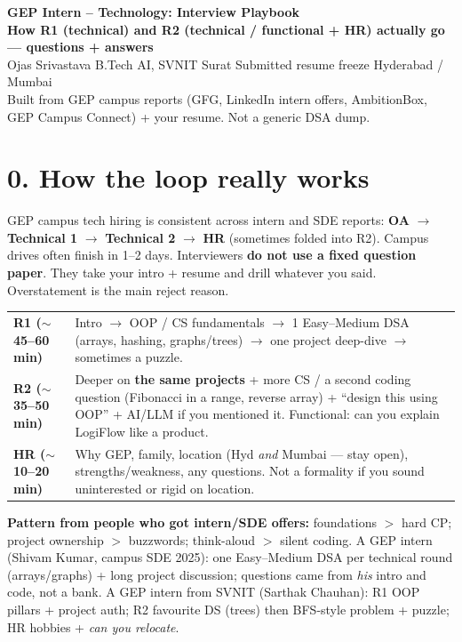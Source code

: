 \documentclass[a4paper,9.5pt]{extarticle}
\begin{document}
\begin{center}
  {\LARGE\textbf{GEP Intern -- Technology: Interview Playbook}}\\[2pt]
  {\small\color{hot}\textbf{How R1 (technical) and R2 (technical / functional + HR) actually go --- questions + answers}}\\[3pt]
  {\small Ojas Srivastava \textbar{} B.Tech AI, SVNIT Surat \textbar{} Submitted resume freeze \textbar{} Hyderabad / Mumbai}\\[1pt]
  {\footnotesize\color{muted} Built from GEP campus reports (GFG, LinkedIn intern offers, AmbitionBox, GEP Campus Connect) + your resume. Not a generic DSA dump.}
\end{center}

\section{0. How the loop really works}
GEP campus tech hiring is consistent across intern and SDE reports:
\textbf{OA} $\to$ \textbf{Technical 1} $\to$ \textbf{Technical 2} $\to$ \textbf{HR} (sometimes folded into R2).
Campus drives often finish in 1--2 days. Interviewers \textbf{do not use a fixed question paper}. They take your intro + resume and drill whatever you said. Overstatement is the main reject reason.

\noindent\begin{tabularx}{\textwidth}{@{}>{\bfseries}p{2.6cm} X@{}}
R1 ($\sim$45--60 min) & Intro $\to$ OOP / CS fundamentals $\to$ 1 Easy--Medium DSA (arrays, hashing, graphs/trees) $\to$ one project deep-dive $\to$ sometimes a puzzle. \\
R2 ($\sim$35--50 min) & Deeper on \textbf{the same projects} + more CS / a second coding question (Fibonacci in a range, reverse array) + ``design this using OOP'' + AI/LLM if you mentioned it. Functional: can you explain LogiFlow like a product. \\
HR ($\sim$10--20 min) & Why GEP, family, location (Hyd \emph{and} Mumbai --- stay open), strengths/weakness, any questions. Not a formality if you sound uninterested or rigid on location. \\
\end{tabularx}

\textbf{Pattern from people who got intern/SDE offers:}
foundations $>$ hard CP; project ownership $>$ buzzwords; think-aloud $>$ silent coding.
A GEP intern (Shivam Kumar, campus SDE 2025): one Easy--Medium DSA per technical round (arrays/graphs) + long project discussion; questions came from \emph{his} intro and code, not a bank.
A GEP intern from SVNIT (Sarthak Chauhan): R1 OOP pillars + project auth; R2 favourite DS (trees) then BFS-style problem + puzzle; HR hobbies + \emph{can you relocate}.
\end{document}
